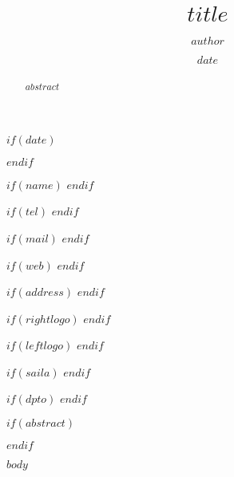 \documentclass[$if(classoptions)$$classoptions$$endif$]{ifreport}
\begin{document}
\title{$title$}
\author{$author$}

$if(date)$
\date{$date$}
$endif$

$if(name)$
$endif$

$if(tel)$
$endif$

$if(mail)$
$endif$

$if(web)$
$endif$

$if(address)$
$endif$

$if(rightlogo)$
$endif$


$if(leftlogo)$
$endif$

$if(saila)$
$endif$

$if(dpto)$
$endif$

\maketitle
$if(abstract)$
\begin{abstract}
$abstract$
\end{abstract}
$endif$


$body$
\end{document}
